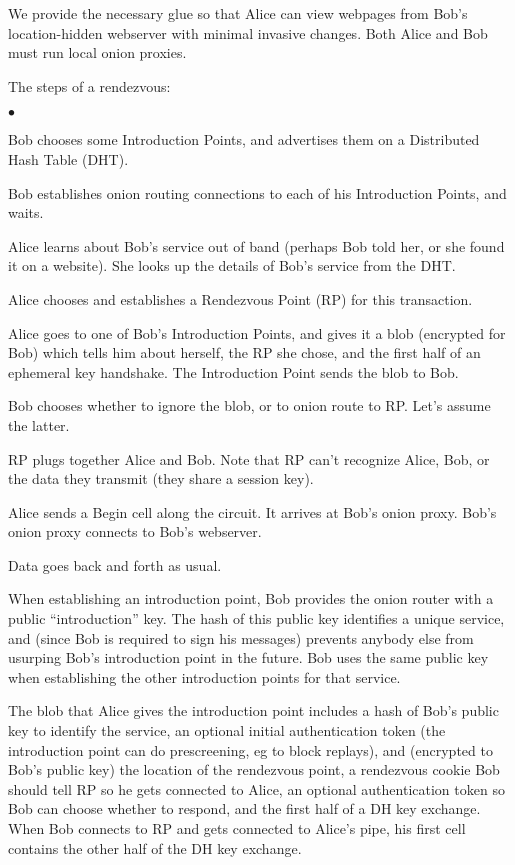 \documentclass[times,10pt,twocolumn]{article}
\newenvironment{tightlist}{\begin{list}{$\bullet$}{
  \setlength{\itemsep}{0mm}
    \setlength{\parsep}{0mm}
    }}{\end{list}}
\begin{document}
We provide the necessary glue so that Alice can view webpages from Bob's
location-hidden webserver with minimal invasive changes. Both Alice and
Bob must run local onion proxies.

The steps of a rendezvous:
\begin{tightlist}
\item Bob chooses some Introduction Points, and advertises them on a
      Distributed Hash Table (DHT).
\item Bob establishes onion routing connections to each of his
      Introduction Points, and waits.
\item Alice learns about Bob's service out of band (perhaps Bob told her,
      or she found it on a website). She looks up the details of Bob's
      service from the DHT.
\item Alice chooses and establishes a Rendezvous Point (RP) for this
      transaction.
\item Alice goes to one of Bob's Introduction Points, and gives it a blob
      (encrypted for Bob) which tells him about herself, the RP
      she chose, and the first half of an ephemeral key handshake. The
      Introduction Point sends the blob to Bob.
\item Bob chooses whether to ignore the blob, or to onion route to RP.
      Let's assume the latter.
\item RP plugs together Alice and Bob. Note that RP can't recognize Alice,
      Bob, or the data they transmit (they share a session key).
\item Alice sends a Begin cell along the circuit. It arrives at Bob's
      onion proxy. Bob's onion proxy connects to Bob's webserver.
\item Data goes back and forth as usual.
\end{tightlist}

When establishing an introduction point, Bob provides the onion router
with a public ``introduction'' key.  The hash of this public key
identifies a unique service, and (since Bob is required to sign his
messages) prevents anybody else from usurping Bob's introduction point
in the future. Bob uses the same public key when establishing the other
introduction points for that service.

The blob that Alice gives the introduction point includes a hash of Bob's
public key to identify the service, an optional initial authentication
token (the introduction point can do prescreening, eg to block replays),
and (encrypted to Bob's public key) the location of the rendezvous point,
a rendezvous cookie Bob should tell RP so he gets connected to
Alice, an optional authentication token so Bob can choose whether to respond,
and the first half of a DH key exchange. When Bob connects to RP
and gets connected to Alice's pipe, his first cell contains the
other half of the DH key exchange.
\end{document}

